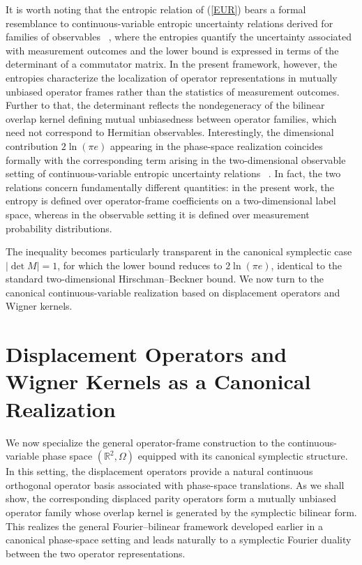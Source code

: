 \documentclass[aps,pra,onecolumn,nofootinbib,superscriptaddress,showpacs]{revtex4}
\begin{document}
It is worth noting that the entropic relation of (\ref{EUR}) bears a formal resemblance to continuous-variable entropic uncertainty relations derived for families of observables ~\cite{Cerf1,Cerf2}, where the entropies quantify the uncertainty associated with measurement outcomes and the lower bound is expressed in terms of the determinant of a commutator matrix. In the present framework, however,  the entropies characterize the localization of operator representations in mutually unbiased operator frames rather than the statistics of measurement outcomes. Further to that, the determinant reflects the nondegeneracy of the bilinear overlap kernel defining mutual unbiasedness between operator families, which need not correspond to Hermitian observables. Interestingly, the dimensional contribution $2\ln(\pi e)$ appearing in the phase-space realization coincides formally with the corresponding term arising in the two-dimensional observable setting of continuous-variable entropic uncertainty relations ~\cite{Cerf1,Cerf2}. In fact, the two relations concern fundamentally different quantities: in the present work, the entropy is defined over operator-frame coefficients on a two-dimensional label space, whereas in the observable setting it is defined over measurement probability distributions.


The inequality becomes particularly transparent in the
canonical symplectic case \(|\det M|=1\), for which
the lower bound reduces to \(2\ln(\pi e)\), identical
to the standard two-dimensional Hirschman--Beckner
bound. We now turn to the canonical continuous-variable realization based on
displacement operators and Wigner kernels.  

\section{Displacement Operators and Wigner Kernels as a Canonical Realization}

\noindent \noindent We now specialize the general operator-frame construction to the
continuous-variable phase space $(\mathbb R^2,\Omega)$ equipped with its
canonical symplectic structure. In this setting, the displacement operators
provide a natural continuous orthogonal operator basis associated with
phase-space translations. As we shall show, the corresponding displaced parity
operators form a mutually unbiased operator family whose overlap kernel is
generated by the symplectic bilinear form. This realizes the general
Fourier--bilinear framework developed earlier in a canonical phase-space
setting and leads naturally to a symplectic Fourier duality between the two
operator representations.
\end{document}
